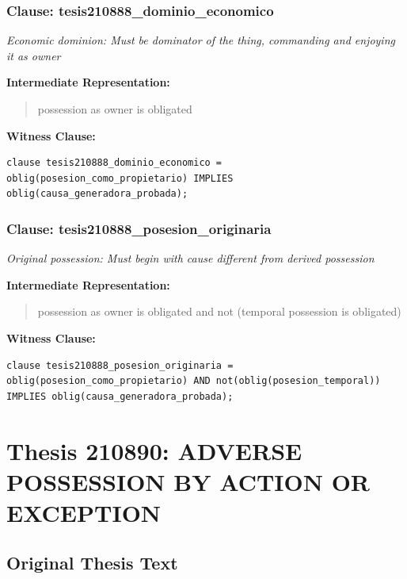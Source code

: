 \documentclass[11pt,a4paper]{article}
\begin{document}
\subsubsection{Clause: tesis210888\_dominio\_economico}

\textit{Economic dominion: Must be dominator of the thing, commanding and enjoying it as owner}

\textbf{Intermediate Representation:}

\begin{quote}
possession as owner is obligated
\end{quote}

\textbf{Witness Clause:}

\begin{lstlisting}[style=witnessstyle, language=Witness]
clause tesis210888_dominio_economico = oblig(posesion_como_propietario) IMPLIES oblig(causa_generadora_probada);
\end{lstlisting}

\subsubsection{Clause: tesis210888\_posesion\_originaria}

\textit{Original possession: Must begin with cause different from derived possession}

\textbf{Intermediate Representation:}

\begin{quote}
possession as owner is obligated and not (temporal possession is obligated)
\end{quote}

\textbf{Witness Clause:}

\begin{lstlisting}[style=witnessstyle, language=Witness]
clause tesis210888_posesion_originaria = oblig(posesion_como_propietario) AND not(oblig(posesion_temporal)) IMPLIES oblig(causa_generadora_probada);
\end{lstlisting}

\newpage

\section{Thesis 210890: ADVERSE POSSESSION BY ACTION OR EXCEPTION}
\label{thesis:210890}

\subsection{Original Thesis Text}
\end{document}
